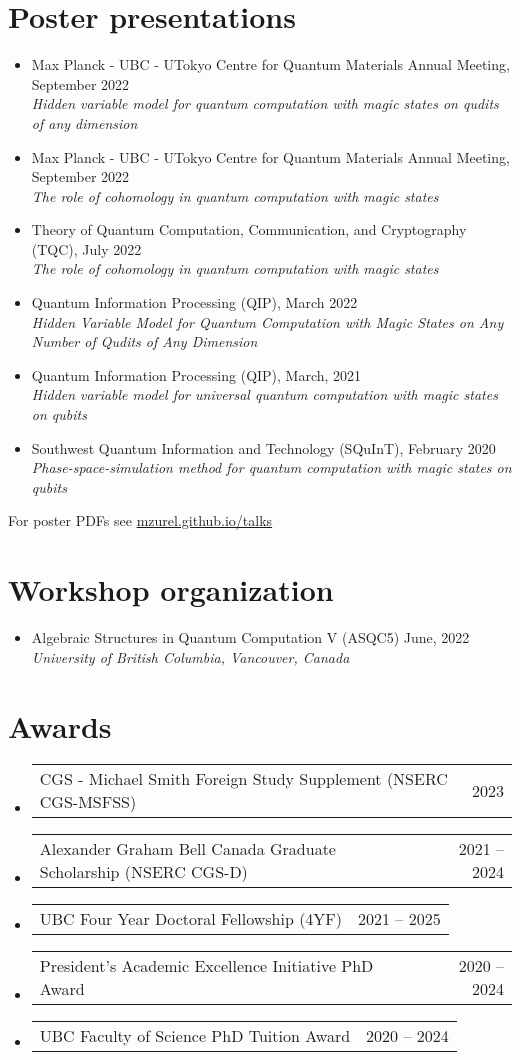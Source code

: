 \documentclass[letterpaper,11pt]{article}
\makeatletter
\newcommand{\ConferenceItem}[3]{
	\item{\parbox{0.97\textwidth}{
		{#1}  \hfill {#2}\\
		\emph{#3}
	}}
}
\newcommand{\AwardsItem}[2]{
	\item{\vspace{-1pt}
		\begin{tabular*}{0.97\textwidth}{l@{\extracolsep{\fill}}r}
			{#1} & {#2}
		\end{tabular*}
		\vspace{-5pt}
	}
}
\makeatother
\begin{document}
\section*{Poster presentations}
\begin{itemize}[leftmargin=*]
	\ConferenceItem{Max Planck - UBC - UTokyo Centre for Quantum Materials Annual Meeting, September 2022}{}{Hidden variable model for quantum computation with magic states on qudits of any dimension}
	
	\ConferenceItem{Max Planck - UBC - UTokyo Centre for Quantum Materials Annual Meeting, September 2022}{}{The role of cohomology in quantum computation with magic states}
	
	\ConferenceItem{Theory of Quantum Computation, Communication, and Cryptography (TQC), July 2022}{}{The role of cohomology in quantum computation with magic states}
	
	\ConferenceItem{Quantum Information Processing (QIP), March 2022}{}{Hidden Variable Model for Quantum Computation with Magic States on Any Number of Qudits of Any Dimension}
	
	\ConferenceItem{Quantum Information Processing (QIP), March, 2021}{}{Hidden variable model for universal quantum computation with magic states on qubits}
	
	\ConferenceItem{Southwest Quantum Information and Technology (SQuInT), February 2020}{}{Phase-space-simulation method for quantum computation with magic states on qubits}
\end{itemize}
For poster PDFs see \href{https://mzurel.github.io/talks}{mzurel.github.io/talks}

\section*{Workshop organization}
\begin{itemize}[leftmargin=*]
	\ConferenceItem{Algebraic Structures in Quantum Computation V (ASQC5)}{June, 2022}{University of British Columbia, Vancouver, Canada}
\end{itemize}

\section*{Awards}
\begin{itemize}[leftmargin=*]
	\AwardsItem{CGS - Michael Smith Foreign Study Supplement (NSERC CGS-MSFSS)}{2023}
	\AwardsItem{Alexander Graham Bell Canada Graduate Scholarship (NSERC CGS-D)}{2021 -- 2024}
	\AwardsItem{UBC Four Year Doctoral Fellowship (4YF)}{2021 -- 2025}
	\AwardsItem{President's Academic Excellence Initiative PhD Award}{2020 -- 2024}
	\AwardsItem{UBC Faculty of Science PhD Tuition Award }{2020 -- 2024}
\end{itemize}
\end{document}
